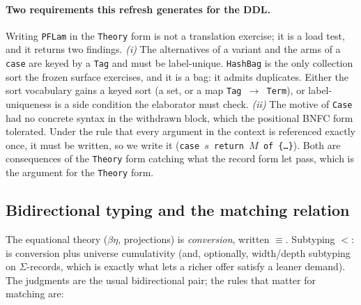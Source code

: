 \documentclass[11pt]{article}
\newcommand{\Type}{\mathsf{Type}}
\newcommand{\hole}[2]{\ensuremath{?#1\!:\!#2}}
\newcommand{\conv}{\equiv}
\newcommand{\subt}{\mathrel{<:}}
\newcommand{\tele}{\Gamma}
\newcommand{\tm}{t}
\begin{document}
\paragraph{Two requirements this refresh generates for the DDL.} Writing \texttt{PFLam} in the
\texttt{Theory} form is not a translation exercise; it is a load test, and it returns two findings.
\emph{(i)} The alternatives of a variant and the arms of a \texttt{case} are keyed by a
\texttt{Tag} and must be label-unique. \texttt{HashBag} is the only collection sort the frozen
surface exercises, and it is a bag: it admits duplicates. Either the sort vocabulary gains a keyed
sort (a set, or a map \texttt{Tag $\to$ Term}), or label-uniqueness is a side condition the
elaborator must check. \emph{(ii)} The motive of \texttt{Case} had no concrete syntax in the
withdrawn block, which the positional BNFC form tolerated. Under the rule that every argument in
the context is referenced exactly once, it must be written, so we write it
(\texttt{case $s$ return $M$ of \{\dots\}}). Both are consequences of the \texttt{Theory} form
catching what the record form let pass, which is the argument for the \texttt{Theory} form.

\subsection{Bidirectional typing and the matching relation}\label{sec:typing}
The equational theory ($\beta\eta$, projections) is \emph{conversion}, written $\conv$. Subtyping
$\subt$ is conversion plus universe cumulativity (and, optionally, width/depth subtyping on
$\Sigma$-records, which is exactly what lets a richer offer satisfy a leaner demand). The judgments
are the usual bidirectional pair; the rules that matter for matching are:

\end{document}
